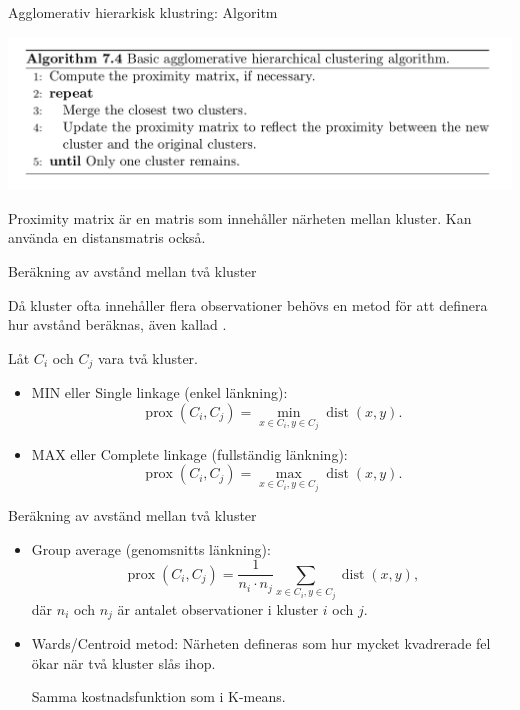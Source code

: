 \documentclass[10pt,english]{beamer}
\begin{document}
\begin{frame}{Agglomerativ hierarkisk klustring: Algoritm}

    \includegraphics[width = \textwidth]{figs/hclut_alg.png}

    Proximity matrix är en matris som innehåller närheten mellan kluster. Kan använda en distansmatris också.

\end{frame}

\begin{frame}{Beräkning av avstånd mellan två kluster}

    Då kluster ofta innehåller flera observationer behövs en metod för att definera hur avstånd beräknas, även kallad .

    Låt $C_i$ och $C_j$ vara två kluster.
    \begin{itemize}
        \item MIN eller Single linkage (enkel länkning):
        \begin{equation*}
            \operatorname{prox}(C_i, C_j) = \min_{x \in C_i, y \in C_j} \operatorname{dist}(x, y).
        \end{equation*}
        \item MAX eller Complete linkage (fullständig länkning):
        \begin{equation*}
            \operatorname{prox}(C_i, C_j) = \max_{x \in C_i, y \in C_j} \operatorname{dist}(x, y).
        \end{equation*}
    \end{itemize}
    
\end{frame}

\begin{frame}{Beräkning av avständ mellan två kluster}

    \begin{itemize}
        \item Group average (genomsnitts länkning):
        \begin{equation*}
            \operatorname{prox}(C_i, C_j) = \frac{1}{n_i \cdot n_j} \sum_{x \in C_i, y \in C_j} \operatorname{dist}(x,y),
        \end{equation*}
        där $n_i$ och $n_j$ är antalet observationer i kluster $i$ och $j$.
        \item Wards/Centroid metod: Närheten defineras som hur mycket kvadrerade fel ökar när två kluster slås ihop.
        
        Samma kostnadsfunktion som i K-means.
    \end{itemize}
    
\end{frame}
\end{document}

